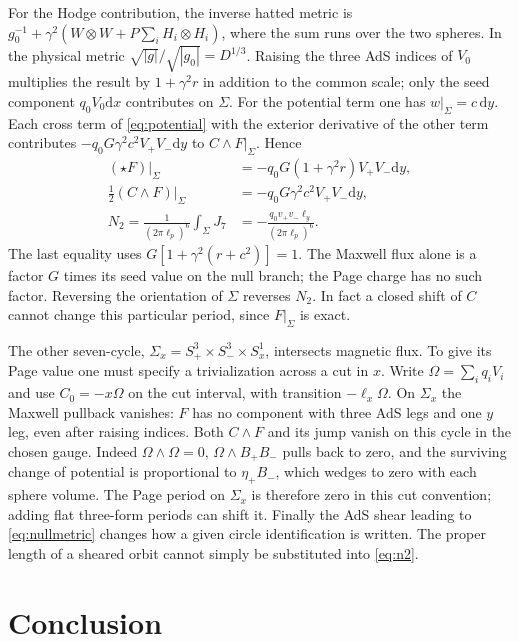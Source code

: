 \documentclass[11pt,a4paper]{article}
\numberwithin{equation}{section}
\newcommand{\dd}{\mathrm{d}}
\begin{document}
For the Hodge contribution, the inverse hatted metric is $g_0^{-1}+\gamma^2(W\otimes W+P\sum_i H_i\otimes H_i)$, where the sum runs over the two spheres. In the physical metric $\sqrt{|g|}/\sqrt{|g_0|}=D^{1/3}$. Raising the three AdS indices of $V_0$ multiplies the result by $1+\gamma^2 r$ in addition to the common scale; only the seed component $q_0V_0\dd x$ contributes on $\Sigma$. For the potential term one has $w|_\Sigma=c\,\dd y$. Each cross term of \eqref{eq:potential} with the exterior derivative of the other term contributes $-q_0G\gamma^2c^2 V_+V_-\dd y$ to $C\wedge F|_\Sigma$. Hence
\begin{align}
 (\star F)|_\Sigma&=-q_0G(1+\gamma^2r)V_+V_-\dd y,\nonumber\\
 \tfrac12(C\wedge F)|_\Sigma&=-q_0G\gamma^2 c^2 V_+V_-\dd y,\nonumber\\
 N_2=\frac{1}{(2\pi\ell_p)^6}\int_\Sigma J_7&=-\frac{q_0v_+v_-\ell_y}{(2\pi\ell_p)^6}.\label{eq:n2}
\end{align}
The last equality uses $G[1+\gamma^2(r+c^2)]=1$. The Maxwell flux alone is a factor $G$ times its seed value on the null branch; the Page charge has no such factor. Reversing the orientation of $\Sigma$ reverses $N_2$. In fact a closed shift of $C$ cannot change this particular period, since $F|_\Sigma$ is exact.

The other seven-cycle, $\Sigma_x=S_+^3\times S_-^3\times S_x^1$, intersects magnetic flux. To give its Page value one must specify a trivialization across a cut in $x$. Write $\Omega=\sum_iq_iV_i$ and use $C_0=-x\Omega$ on the cut interval, with transition $-\ell_x\Omega$. On $\Sigma_x$ the Maxwell pullback vanishes: $F$ has no component with three AdS legs and one $y$ leg, even after raising indices. Both $C\wedge F$ and its jump vanish on this cycle in the chosen gauge. Indeed $\Omega\wedge\Omega=0$, $\Omega\wedge B_+B_-$ pulls back to zero, and the surviving change of potential is proportional to $\eta_+B_-$, which wedges to zero with each sphere volume. The Page period on $\Sigma_x$ is therefore zero in this cut convention; adding flat three-form periods can shift it. Finally the AdS shear leading to \eqref{eq:nullmetric} changes how a given circle identification is written. The proper length of a sheared orbit cannot simply be substituted into \eqref{eq:n2}.



\section{Conclusion}
\end{document}
